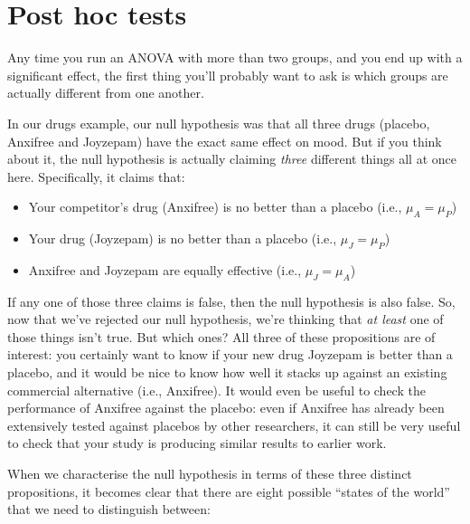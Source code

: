 \documentclass[
  11pt,
  a4paper,
  twoside,symmetric,openright]{book}
\providecommand{\tightlist}{%
  \setlength{\itemsep}{0pt}\setlength{\parskip}{0pt}}
\theoremstyle{break}
\theoremstyle{break}
\begin{document}
\section{Post hoc tests}\label{posthoc}

Any time you run an ANOVA with more than two groups, and you end up with a significant effect, the first thing you'll probably want to ask is which groups are actually different from one another.

In our drugs example, our null hypothesis was that all three drugs (placebo, Anxifree and Joyzepam) have the exact same effect on mood. But if you think about it, the null hypothesis is actually claiming \emph{three} different things all at once here. Specifically, it claims that:

\begin{itemize}
\tightlist
\item
  Your competitor's drug (Anxifree) is no better than a placebo (i.e., \(\mu_A = \mu_P\))
\item
  Your drug (Joyzepam) is no better than a placebo (i.e., \(\mu_J = \mu_P\))
\item
  Anxifree and Joyzepam are equally effective (i.e., \(\mu_J = \mu_A\))
\end{itemize}

If any one of those three claims is false, then the null hypothesis is also false. So, now that we've rejected our null hypothesis, we're thinking that \emph{at least} one of those things isn't true. But which ones? All three of these propositions are of interest: you certainly want to know if your new drug Joyzepam is better than a placebo, and it would be nice to know how well it stacks up against an existing commercial alternative (i.e., Anxifree). It would even be useful to check the performance of Anxifree against the placebo: even if Anxifree has already been extensively tested against placebos by other researchers, it can still be very useful to check that your study is producing similar results to earlier work.

When we characterise the null hypothesis in terms of these three distinct propositions, it becomes clear that there are eight possible ``states of the world'' that we need to distinguish between:
\end{document}
